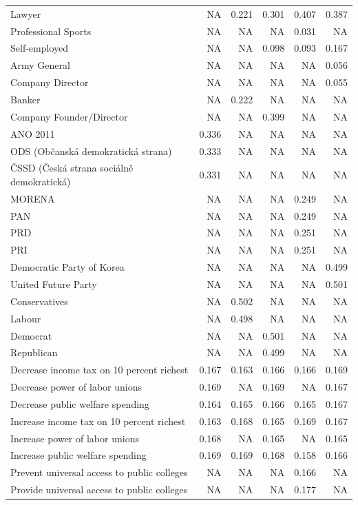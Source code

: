 \documentclass[
  12pt,
]{article}
\begin{document}
\begin{longtable}[t]{>{\raggedright\arraybackslash}p{7cm}rrrrr}
Lawyer & NA & 0.221 & 0.301 & 0.407 & 0.387\\
Professional Sports & NA & NA & NA & 0.031 & NA\\
Self-employed & NA & NA & 0.098 & 0.093 & 0.167\\
\addlinespace
Army General & NA & NA & NA & NA & 0.056\\
Company Director & NA & NA & NA & NA & 0.055\\
Banker & NA & 0.222 & NA & NA & NA\\
Company Founder/Director & NA & NA & 0.399 & NA & NA\\
ANO 2011 & 0.336 & NA & NA & NA & NA\\
\addlinespace
ODS (Občanská demokratická strana) & 0.333 & NA & NA & NA & NA\\
ČSSD (Česká strana sociálně demokratická) & 0.331 & NA & NA & NA & NA\\
MORENA & NA & NA & NA & 0.249 & NA\\
PAN & NA & NA & NA & 0.249 & NA\\
PRD & NA & NA & NA & 0.251 & NA\\
\addlinespace
PRI & NA & NA & NA & 0.251 & NA\\
Democratic Party of Korea & NA & NA & NA & NA & 0.499\\
United Future Party & NA & NA & NA & NA & 0.501\\
Conservatives & NA & 0.502 & NA & NA & NA\\
Labour & NA & 0.498 & NA & NA & NA\\
\addlinespace
Democrat & NA & NA & 0.501 & NA & NA\\
Republican & NA & NA & 0.499 & NA & NA\\
Decrease income tax on 10 percent richest & 0.167 & 0.163 & 0.166 & 0.166 & 0.169\\
Decrease power of labor unions & 0.169 & NA & 0.169 & NA & 0.167\\
Decrease public welfare spending & 0.164 & 0.165 & 0.166 & 0.165 & 0.167\\
\addlinespace
Increase income tax on 10 percent richest & 0.163 & 0.168 & 0.165 & 0.169 & 0.167\\
Increase power of labor unions & 0.168 & NA & 0.165 & NA & 0.165\\
Increase public welfare spending & 0.169 & 0.169 & 0.168 & 0.158 & 0.166\\
Prevent universal access to public colleges & NA & NA & NA & 0.166 & NA\\
Provide universal access to public colleges & NA & NA & NA & 0.177 & NA\\

\end{longtable}
\end{document}
